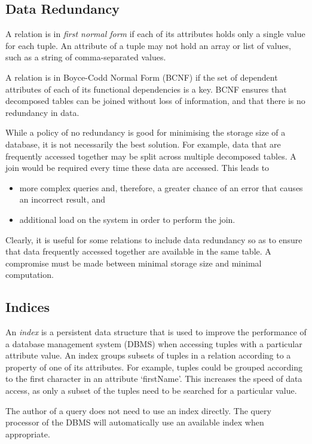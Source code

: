 \subsection{Data Redundancy}

A relation is in \emph{first normal form} if each of its attributes holds only a single value for each tuple.
An attribute of a tuple may not hold an array or list of values, such as a string of comma-separated values.

A relation is in Boyce-Codd Normal Form (BCNF) if the set of dependent attributes of each of its functional dependencies is a key.
BCNF ensures that decomposed tables can be joined without loss of information, and that there is no redundancy in data.

While a policy of no redundancy is good for minimising the storage size of a database, it is not necessarily the best solution.
For example, data that are frequently accessed together may be split across multiple decomposed tables.
A join would be required every time these data are accessed.
This leads to
\begin{itemize}
  \item more complex queries and, therefore, a greater chance of an error that causes an incorrect result, and
  \item additional load on the system in order to perform the join.
\end{itemize}
Clearly, it is useful for some relations to include data redundancy so as to ensure that data frequently accessed together are available in the same table.
A compromise must be made between minimal storage size and minimal computation.

\subsection{Indices}

An \emph{index} is a persistent data structure that is used to improve the performance of a database management system (DBMS) when accessing tuples with a particular attribute value.
An index groups subsets of tuples in a relation according to a property of one of its attributes.
For example, tuples could be grouped according to the first character in an attribute `firstName'.
This increases the speed of data access, as only a subset of the tuples need to be searched for a particular value.

The author of a query does not need to use an index directly.
The query processor of the DBMS will automatically use an available index when appropriate.

